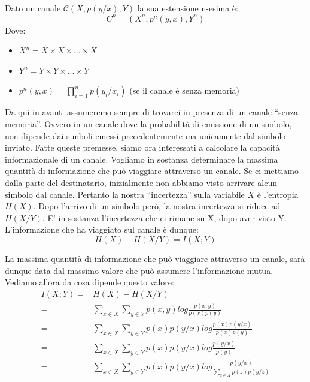 \bigskip

\begin{definizione}
 Dato un canale $\mathcal{C}(X,p(y/x),Y)$ la sua estensione n-esima è:
\[
 C^n=(X^n,p^n(y,x),Y^n)
\]
Dove:
\begin{itemize}
 \item $X^n=X \times X \times ... \times X$
 \item $Y^n=Y \times Y \times ... \times Y$
 \item $p^n(y,x)=\prod_{i=1}^n p(y_i/x_i)$ (se il canale è senza memoria)
\end{itemize}
\end{definizione}

\bigskip

Da qui in avanti assumeremo sempre di trovarci in presenza di un canale ``senza memoria''. Ovvero in un canale dove la probabilità 
di emissione di un simbolo, non dipende dai simboli emessi precedentemente ma unicamente dal simbolo inviato.
Fatte queste premesse, siamo ora interessati a calcolare la capacità informazionale di un canale. Vogliamo in sostanza determinare 
la massima quantità di informazione che può viaggiare attraverso un canale. Se ci mettiamo dalla parte del destinatario, inizialmente 
non abbiamo visto arrivare alcun simbolo dal canale. Pertanto la nostra ``incertezza'' sulla variabile $X$ è l'entropia $H(X)$. Dopo l'arrivo di un simbolo però, la nostra incertezza si riduce ad $H(X/Y)$. E' in sostanza l'incertezza che ci rimane su X, dopo aver 
visto Y. L'informazione che ha viaggiato sul canale è dunque:
\[
 H(X)-H(X/Y)=I(X;Y)
\]

La massima quantità di informazione che può viaggiare attraverso un canale, sarà dunque data dal massimo valore che può 
assumere l'informazione mutua. Vediamo allora da cosa dipende questo valore:
\[\begin{split}
 I(X;Y)=&H(X)-H(X/Y) \\
        =&\sum_{x \in X} \sum_{y \in Y} p(x,y) log \frac{p(x,y)}{p(x)p(y)} \\
        =&\sum_{x \in X} \sum_{y \in Y} p(x)p(y/x) log \frac{p(x)p(y/x)}{p(x)p(y)} \\
        =&\sum_{x \in X} \sum_{y \in Y} p(x)p(y/x) log \frac{p(y/x)}{p(y)} \\
        =&\sum_{x \in X} \sum_{y \in Y} p(x)p(y/x) log \frac{p(y/x)}{ \displaystyle\sum_{z \in X} p(z)p(y/z)} \\
  \end{split}
\]

